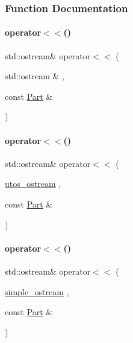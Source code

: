 \subsubsection{Function Documentation}
\mbox{\label{_parts_8h_a41bf212a0001ee2061948fe863a2295b}} 
\paragraph{\texorpdfstring{operator$<$$<$()}{operator<<()}\hspace{0.1cm}{\footnotesize\ttfamily [1/40]}}
{\footnotesize\ttfamily std\+::ostream\& operator$<$$<$ (\begin{DoxyParamCaption}\item[{std\+::ostream \&}]{,  }\item[{const \mbox{\hyperlink{class_part}{Part}} \&}]{ }\end{DoxyParamCaption})}

\mbox{\label{_parts_8h_a386ca228c4aa707c208d57d17150c7b4}} 
\paragraph{\texorpdfstring{operator$<$$<$()}{operator<<()}\hspace{0.1cm}{\footnotesize\ttfamily [2/40]}}
{\footnotesize\ttfamily std\+::ostream\& operator$<$$<$ (\begin{DoxyParamCaption}\item[{\mbox{\hyperlink{structutos__ostream}{utos\+\_\+ostream}}}]{,  }\item[{const \mbox{\hyperlink{class_part}{Part}} \&}]{ }\end{DoxyParamCaption})}

\mbox{\label{_parts_8h_a83b50732b2aaf6def6c01031274e685b}} 
\paragraph{\texorpdfstring{operator$<$$<$()}{operator<<()}\hspace{0.1cm}{\footnotesize\ttfamily [3/40]}}
{\footnotesize\ttfamily std\+::ostream\& operator$<$$<$ (\begin{DoxyParamCaption}\item[{\mbox{\hyperlink{structsimple__ostream}{simple\+\_\+ostream}}}]{,  }\item[{const \mbox{\hyperlink{class_part}{Part}} \&}]{ }\end{DoxyParamCaption})}

